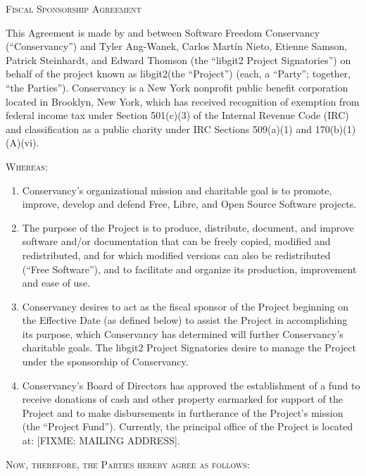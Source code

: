 \documentclass[letterpaper,12pt]{article}
\newcommand{\projectname}{libgit2\xspace}
\newcommand{\signatories}{libgit2 Project Signatories\xspace}
\begin{document}
\begin{center}
\textsc{\Huge Fiscal Sponsorship Agreement}{\Huge {} } 
\par\end{center}

\bigskip{}


This Agreement is made by and between Software Freedom Conservancy
(``Conservancy'') and Tyler Ang-Wanek, Carlos Martín Nieto, Etienne
Samson, Patrick Steinhardt, and Edward Thomson (the ``\signatories'')
on behalf of the project known as \projectname (the ``Project'') (each, a 
``Party''; together, ``the Parties'').  Conservancy is a New York nonprofit 
public benefit corporation located in Brooklyn, New York, which has received 
recognition of exemption from federal income tax under Section 501(c)(3) of 
the Internal Revenue Code (IRC) and classification as a public charity under 
IRC Sections 509(a)(1) and 170(b)(1)(A)(vi).

\textsc{Whereas:}

\begin{enumerate}[label=\Alph*.,ref=\S \Alph*]
\item Conservancy's organizational mission and charitable goal is to promote,
improve, develop and defend Free, Libre, and Open Source Software
projects. 
\item The purpose of the Project is to produce, distribute, document, and
improve software and/or documentation that can be freely copied, modified and redistributed,
and for which modified versions can also be redistributed (``Free Software''),
and to facilitate and organize its production, improvement and ease
of use. 
\item Conservancy desires to act as the fiscal sponsor of the Project beginning
on the Effective Date (as defined below) to assist the Project in
accomplishing its purpose, which Conservancy has determined will further
Conservancy's charitable goals. The \signatories desire to manage
the Project under the sponsorship of Conservancy. 
\item Conservancy's Board of Directors has approved the establishment
of a fund to receive donations of cash and other property earmarked
for support of the Project and to make disbursements in furtherance
of the Project's mission (the ``Project Fund''). Currently, the
principal office of the Project is located at: [FIXME: MAILING ADDRESS]. 
\end{enumerate}
\medskip{}


\textsc{Now, therefore, the Parties hereby agree as follows:}
\end{document}
